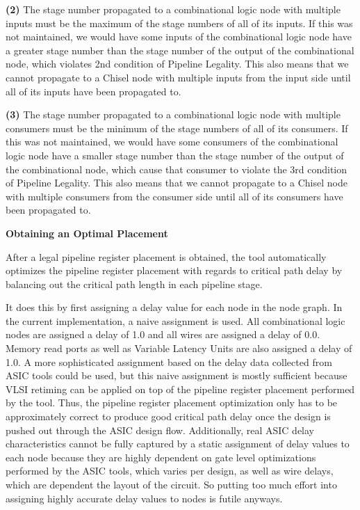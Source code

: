 {\bf (2)}  The stage number propagated to a combinational logic node with multiple inputs must be the maximum of the stage numbers of all of its inputs. If this was not maintained, we would have some inputs of the combinational logic node have a greater stage number than the stage number of the output of the combinational node, which violates 2nd condition of Pipeline Legality. This also means that we cannot propagate to a Chisel node with multiple inputs from the input side until all of its inputs have been propagated to.

{\bf (3)} The stage number propagated to a combinational logic node with multiple consumers must be the minimum of the stage numbers of all of its consumers. If this was not maintained, we would have some consumers of the combinational logic node have a smaller stage number than the stage number of the output of the combinational node, which cause that consumer to violate the 3rd condition of Pipeline Legality. This also means that we cannot propagate to a Chisel node with multiple consumers from the consumer side until all of its consumers have been propagated to.


{\bf Obtaining an Optimal Placement}

After a legal pipeline register placement is obtained, the tool automatically optimizes the pipeline register placement with regards to critical path delay by balancing out the critical path length in each pipeline stage. 

It does this by first assigning a delay value for each node in the node graph. In the current implementation, a naive assignment is used. All combinational logic nodes are assigned a delay of 1.0 and all wires are assigned a delay of 0.0. Memory read ports as well as Variable Latency Units are also assigned a delay of 1.0. A more sophisticated assignment based on the delay data collected from ASIC tools could be used, but this naive assignment is mostly sufficient because VLSI retiming can be applied on top of the pipeline register placement performed by the tool. Thus, the pipeline register placement optimization only has to be approximately correct to produce good critical path delay once the design is pushed out through the ASIC design flow. Additionally, real ASIC delay characteristics cannot be fully captured by a static assignment of delay values to each node because they are highly dependent on gate level optimizations performed by the ASIC tools, which varies per design, as well as wire delays, which are dependent the layout of the circuit. So putting too much effort into assigning highly accurate delay values to nodes is futile anyways. 

